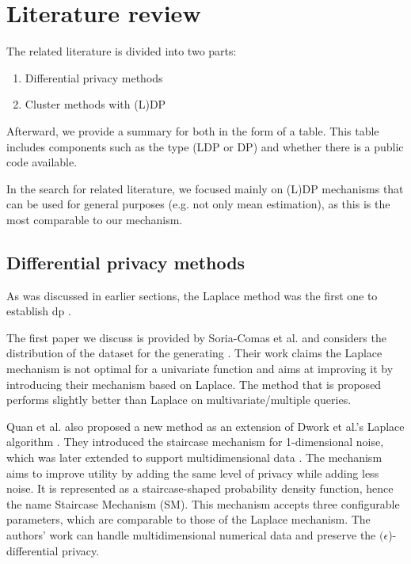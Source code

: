 \section{Literature review} \label{theory:literature-review}
The related literature is divided into two parts:
\begin{enumerate}
  \item Differential privacy methods
  \item Cluster methods with (L)DP
\end{enumerate}
Afterward, we provide a summary for both in the form of a table.
This table includes components such as the type (LDP or DP) and whether there is a public code available.

In the search for related literature, we focused mainly on (L)DP mechanisms that can be used for general purposes (e.g. not only mean estimation), as this is the most comparable to our mechanism.

\subsection{Differential privacy methods}
As was discussed in earlier sections, the Laplace method was the first one to establish \gls{dp} \citep{dwork_differential_2006}.

The first paper we discuss is provided by Soria-Comas et al. and considers the distribution of the dataset for the generating \citep{soria-comas_optimal_2013}.
Their work claims the Laplace mechanism is not optimal for a univariate function and aims at improving it by introducing their mechanism based on Laplace.
The method that is proposed performs slightly better than Laplace on multivariate/multiple queries.

Quan et al. also proposed a new method as an extension of Dwork et al.'s Laplace algorithm \citep{geng_staircase_2013}.
They introduced the staircase mechanism for 1-dimensional noise, which was later extended to support multidimensional data \citep{geng_staircase_2015}.
The mechanism aims to improve utility by adding the same level of privacy while adding less noise.
It is represented as a staircase-shaped probability density function, hence the name Staircase Mechanism (SM).
This mechanism accepts three configurable parameters, which are comparable to those of the Laplace mechanism.
The authors' work can handle multidimensional numerical data and preserve the $(\epsilon$)-differential privacy.

